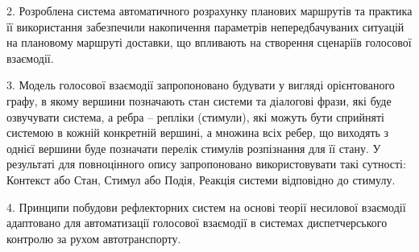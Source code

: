 2. Розроблена система автоматичного розрахунку планових маршрутів та практика її використання забезпечили накопичення параметрів непередбачуваних ситуацій на плановому маршруті доставки, що впливають на створення сценаріїв голосової взаємодії.



3. Модель голосової взаємодії запропоновано будувати у вигляді орієнтованого графу, в якому вершини позначають стан системи та діалогові фрази, які буде озвучувати система, а ребра – репліки (стимули), які можуть бути сприйняті системою в кожній конкретній вершині, а множина всіх ребер, що виходять з однієї вершини буде позначати перелік стимулів розпізнання для її стану. У результаті для повноцінного опису запропоновано використовувати такі сутності: Контекст або Стан, Стимул або Подія, Реакція системи відповідно до стимулу.

4. Принципи побудови рефлекторних систем на основі теорії несилової взаємодії адаптовано для автоматизації голосової взаємодії в системах диспетчерського контролю за рухом автотранспорту.

